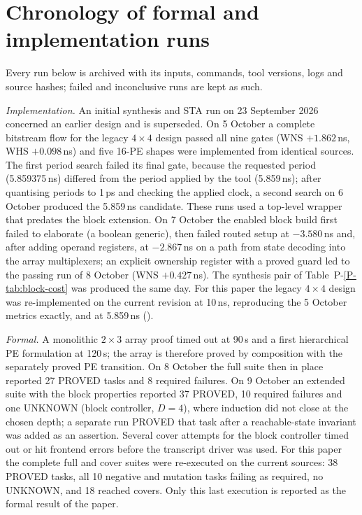 \section{Chronology of formal and implementation runs}

Every run below is archived with its inputs, commands, tool versions, logs
and source hashes; failed and inconclusive runs are kept as such.

\emph{Implementation.} An initial synthesis and STA run on 23 September
2026 concerned an earlier design and is superseded. On 5 October a complete
bitstream flow for the legacy $4\times4$ design passed all nine gates
(WNS $+1.862$\,ns, WHS $+0.098$\,ns) and five 16-PE shapes were implemented
from identical sources. The first period search failed its final gate,
because the requested period (5.859375\,ns) differed from the period applied
by the tool (5.859\,ns); after quantising periods to 1\,ps and checking the
applied clock, a second search on 6 October produced the 5.859\,ns
candidate. These runs used a top-level wrapper that predates the block
extension. On 7 October the enabled block build first failed to elaborate (a
boolean generic), then failed routed setup at $-3.580$\,ns and, after adding
operand registers, at $-2.867$\,ns on a path from state decoding into the
array multiplexers; an explicit ownership register with a proved guard led
to the passing run of 8 October (WNS $+0.427$\,ns). The synthesis pair of
Table~P-\ref{P-tab:block-cost} was produced the same day. For this paper the
legacy $4\times4$ design was re-implemented on the current revision at
10\,ns, reproducing the 5 October metrics exactly, and at 5.859\,ns
(\VivadoFastSummary).

\emph{Formal.} A monolithic $2\times3$ array proof timed out at 90\,s and a
first hierarchical PE formulation at 120\,s; the array is therefore proved
by composition with the separately proved PE transition. On 8 October the
full suite then in place reported 27 PROVED tasks and 8 required failures.
On 9 October an extended suite with the block properties reported 37
PROVED, 10 required failures and one UNKNOWN (block controller, $D=4$),
where induction did not close at the chosen depth; a separate run PROVED
that task after a reachable-state invariant was added as an assertion.
Several cover attempts for the block controller timed out or hit frontend
errors before the transcript driver was used. For this paper the complete
full and cover suites were re-executed on the current sources: 38 PROVED
tasks, all 10 negative and mutation tasks failing as required, no UNKNOWN,
and 18 reached covers. Only this last execution is reported as the formal
result of the paper.
